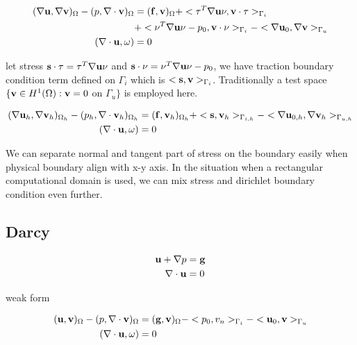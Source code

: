 \begin{equation}
\begin{aligned}
(\nabla \bold{u} , \nabla \bold{v})_{\Omega} - (p,\nabla \cdot \bold{v})_{\Omega} &= (\bold{f},\bold{v})_{\Omega} + 
<\tau^T \nabla \bold{u} \nu, \bold{v}\cdot \tau>_{\Gamma_i}\\
&+ <\nu^T \nabla \bold{u} \nu - p_0, \bold{v}\cdot \nu>_{\Gamma_i} - <\nabla \bold{u}_0, \nabla \bold{v}>_{\Gamma_u}\\
(\nabla \cdot \bold{u}, \omega) &= 0
\end{aligned}
\end{equation}

let stress $\bold{s}\cdot \tau = \tau^T \nabla \bold{u} \nu $ and  $\bold{s} \cdot \nu =  \nu^T \nabla \bold{u} \nu - p_0$, 
we have traction boundary condition term defined on $\Gamma_i$ which is $<\bold{s},\bold{v}>_{\Gamma_i}$.
Traditionally a test space $\{ \bold{v} \in H^1(\Omega) : \bold{v} = 0$ on $\Gamma_u \}$ is employed here.

\begin{equation}
\begin{aligned}
(\nabla \bold{u}_h , \nabla \bold{v}_h)_{\Omega_h} - (p_h,\nabla \cdot \bold{v}_h)_{\Omega_h} &= (\bold{f},\bold{v}_h)_{\Omega_h} + 
		  <\bold{s}, \bold{v}_h>_{\Gamma_{i,h}} - <\nabla \bold{u}_{0,h}, \nabla \bold{v}_h>_{\Gamma_{u,h}}\\
(\nabla \cdot \bold{u}, \omega) &= 0
\end{aligned}
\end{equation}

We can separate normal and tangent part of stress on the boundary easily when physical boundary align with x-y axis.
In the situation when a rectangular computational domain is used, we can mix stress and dirichlet boundary condition
even further. 


\subsection{Darcy}
\begin{equation}
\begin{aligned}
\bold{u} + \nabla p & = \bold{g}\\
\nabla \cdot \bold{u} & = 0
\end{aligned}
\end{equation}

weak form

\begin{equation}
\begin{aligned}
(\bold{u}, \bold{v})_{\Omega} - (p, \nabla \cdot \bold{v})_{\Omega} &= (\bold{g},\bold{v})_{\Omega} 
- <p_0, v_n>_{\Gamma_i} - <\bold{u}_0, \bold{v}>_{\Gamma_u}\\
(\nabla \cdot \bold{u}, \omega) &= 0
\end{aligned}
\end{equation}

